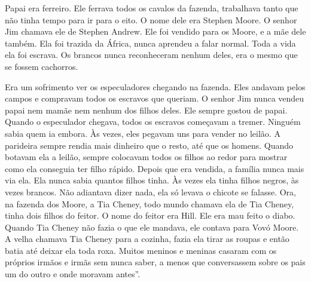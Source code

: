 Papai era ferreiro. Ele ferrava todos os cavalos da fazenda, trabalhava
tanto que não tinha tempo para ir para o eito. O nome dele era Stephen
Moore. O senhor Jim chamava ele de Stephen Andrew. Ele foi vendido para
os Moore, e a mãe dele também. Ela foi trazida da África, nunca aprendeu
a falar normal. Toda a vida ela foi escrava. Os brancos nunca
reconheceram nenhum deles, era o mesmo que se fossem cachorros.

Era um sofrimento ver os especuladores chegando na fazenda. Eles andavam
pelos campos e compravam todos os escravos que queriam. O senhor Jim
nunca vendeu papai nem mamãe nem nenhum dos filhos deles. Ele sempre
gostou de papai. Quando o especulador chegava, todos os escravos
começavam a tremer. Ninguém sabia quem ia embora. Às vezes, eles pegavam
uns para vender no leilão. A parideira sempre rendia mais dinheiro que o
resto, até que os homens. Quando botavam ela a leilão, sempre colocavam
todos os filhos ao redor para mostrar como ela conseguia ter filho
rápido. Depois que era vendida, a família nunca mais via ela. Ela nunca
sabia quantos filhos tinha. Às vezes ela tinha filhos negros, às vezes
brancos. Não adiantava dizer nada, ela só levava o chicote se falasse.
Ora, na fazenda dos Moore, a Tia Cheney, todo mundo chamava ela de Tia
Cheney, tinha dois filhos do feitor. O nome do feitor era Hill. Ele era
mau feito o diabo. Quando Tia Cheney não fazia o que ele mandava, ele
contava para Vovó Moore. A velha chamava Tia Cheney para a cozinha,
fazia ela tirar as roupas e então batia até deixar ela toda roxa. Muitos
meninos e meninas casaram com os próprios irmãos e irmãs sem nunca
saber, a menos que conversassem sobre os pais um do outro e onde moravam
antes''.

